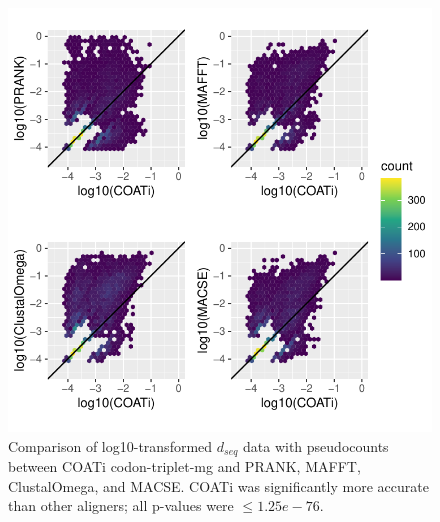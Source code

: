 \documentclass[
]{article}
\begin{document}
\begin{figure}

{\centering \includegraphics{figures/dseq_plots_tri-mg} 

}

\caption{\label{fig:dseq-tri-mg} Comparison of log10-transformed $d_{seq}$ data with pseudocounts between COATi codon-triplet-mg and PRANK, MAFFT, ClustalOmega, and MACSE. COATi was significantly more accurate than other aligners; all p-values were $\leq 1.25e-76$.}\label{fig:dseq1}
\end{figure}
\end{document}
